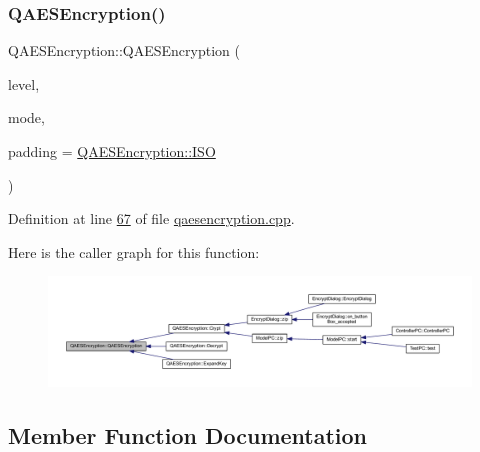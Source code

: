 \subsubsection{\texorpdfstring{Q\+A\+E\+S\+Encryption()}{QAESEncryption()}}
{\footnotesize\ttfamily Q\+A\+E\+S\+Encryption\+::\+Q\+A\+E\+S\+Encryption (\begin{DoxyParamCaption}\item[{\mbox{\hyperlink{class_q_a_e_s_encryption_abe48208f4f6c7d68e6a10b49b9d0b7bd}{Q\+A\+E\+S\+Encryption\+::\+Aes}}}]{level,  }\item[{\mbox{\hyperlink{class_q_a_e_s_encryption_ad3e031c49a3d56566379d75b40b7b255}{Q\+A\+E\+S\+Encryption\+::\+Mode}}}]{mode,  }\item[{\mbox{\hyperlink{class_q_a_e_s_encryption_ab0a65cdea4eac21ef32530010d1b0247}{Q\+A\+E\+S\+Encryption\+::\+Padding}}}]{padding = {\ttfamily \mbox{\hyperlink{class_q_a_e_s_encryption_ab0a65cdea4eac21ef32530010d1b0247a4fb686e6a16d4242ff35311d2e7c422d}{Q\+A\+E\+S\+Encryption\+::\+I\+SO}}} }\end{DoxyParamCaption})}



Definition at line \mbox{\hyperlink{qaesencryption_8cpp_source_l00067}{67}} of file \mbox{\hyperlink{qaesencryption_8cpp_source}{qaesencryption.\+cpp}}.

Here is the caller graph for this function\+:
\nopagebreak
\begin{figure}[H]
\begin{center}
\leavevmode
\includegraphics[width=350pt]{class_q_a_e_s_encryption_aeac0ee8532e69e5d30b023fe38c30b3b_icgraph}
\end{center}
\end{figure}


\subsection{Member Function Documentation}
\mbox{\label{class_q_a_e_s_encryption_a43819eeb6a7cb29fbd3cb6ad640dcbdf}} 
